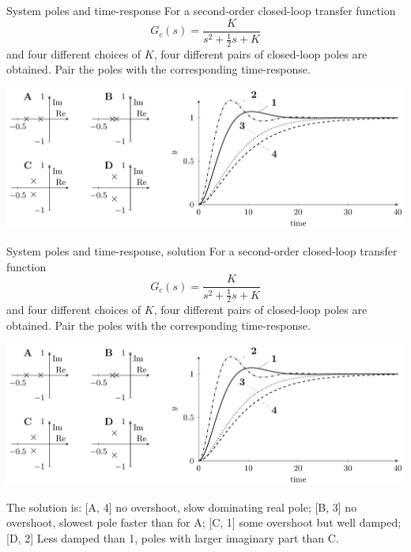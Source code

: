 \documentclass[dvisvgm,hypertex,aspectratio=169]{beamer}
\begin{document}
\note{%
}

\begin{frame}[label=C4E]{System poles and time-response}
For a second-order closed-loop transfer function 
\[  G_c(s) = \frac{K}{s^2 + \frac{1}{2}s + K}\]
and four different choices of $K$, four different pairs of closed-loop poles are obtained.  Pair the poles with the corresponding time-response.
\begin{center}
  \includegraphics[width=0.77\linewidth]{cstr-control-step-beamer.png}
\end{center}
\end{frame}

\note{%
}

\begin{frame}[label=C4S]{System poles and time-response, solution}
For a second-order closed-loop transfer function 
\[  G_c(s) = \frac{K}{s^2 + \frac{1}{2}s + K}\]
and four different choices of $K$, four different pairs of closed-loop poles are obtained.  Pair the poles with the corresponding time-response.
\begin{center}
  \includegraphics[width=0.77\linewidth]{cstr-control-step-beamer.png}
\end{center}

The solution is: [A, 4] no overshoot, slow dominating real pole; [B, 3] no overshoot, slowest pole faster than for A; [C, 1] some overshoot but well damped; [D, 2] Less damped than 1, poles with larger imaginary part than C.

\end{frame}

\note{%
}
\end{document}

